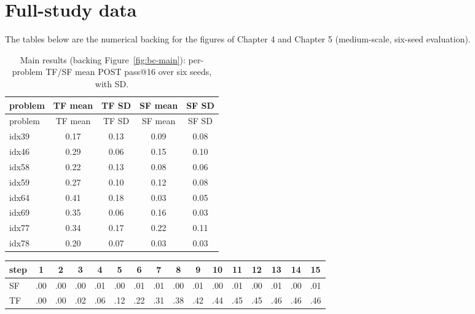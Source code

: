 \chapter{Full-study data}\label{appendix-g-full-study-data}

The tables below are the numerical backing for the figures of Chapter 4 and Chapter 5 (medium-scale, six-seed evaluation).



\begin{longtable}{lcccc}
\caption[Main results: per-problem TF/SF mean POST pass@16]{Main results (backing Figure~\ref{fig:bc-main}): per-problem TF/SF mean POST pass@16 over six seeds, with SD.}\\
\toprule
problem & TF mean & TF SD & SF mean & SF SD \\
\midrule
\endfirsthead
\toprule
problem & TF mean & TF SD & SF mean & SF SD \\
\midrule
\endhead
\bottomrule
\endfoot
idx39 & 0.17 & 0.13 & 0.09 & 0.08 \\
idx46 & 0.29 & 0.06 & 0.15 & 0.10 \\
idx58 & 0.22 & 0.13 & 0.08 & 0.06 \\
idx59 & 0.27 & 0.10 & 0.12 & 0.08 \\
idx64 & 0.41 & 0.18 & 0.03 & 0.05 \\
idx69 & 0.35 & 0.06 & 0.16 & 0.03 \\
idx77 & 0.34 & 0.17 & 0.22 & 0.11 \\
idx78 & 0.20 & 0.07 & 0.03 & 0.03 \\
\end{longtable}



\begin{center}\footnotesize\setlength{\tabcolsep}{3pt}
\begin{tabular}{lccccccccccccccc}
\toprule
step & 1 & 2 & 3 & 4 & 5 & 6 & 7 & 8 & 9 & 10 & 11 & 12 & 13 & 14 & 15 \\
\midrule
SF & .00 & .00 & .00 & .01 & .00 & .01 & .01 & .00 & .01 & .00 & .01 & .00 & .01 & .00 & .01 \\
TF & .00 & .00 & .02 & .06 & .12 & .22 & .31 & .38 & .42 & .44 & .45 & .45 & .46 & .46 & .46 \\
\bottomrule
\end{tabular}\par\end{center}



